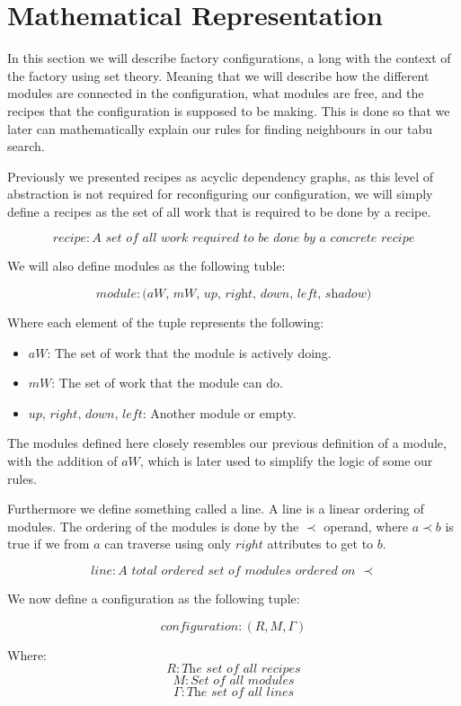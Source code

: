 \section{Mathematical Representation}

In this section we will describe factory configurations, a long with the context of the factory using set theory. Meaning that we will describe how the different modules are connected in the configuration, what modules are free, and the recipes that the configuration is supposed to be making. This is done so that we later can mathematically explain our rules for finding neighbours in our tabu search.

Previously we presented recipes as acyclic dependency graphs, as this level of abstraction is not required for reconfiguring our configuration, we will simply define a recipes as the set of all work that is required to be done by a recipe.

\[recipe: \textit{A set of all work required to be done by a concrete recipe}\]

\noindent We will also define modules as the following tuble:

\[module: \textit{(aW, mW, up, right, down, left, shadow)}\]

\noindent Where each element of the tuple represents the following:
\begin{itemize}
\item $aW$: The set of work that the module is actively doing.
\item $mW$: The set of work that the module can do.
\item $up,\, right,\, down,\, left$: Another module or empty.
\end{itemize}

The modules defined here closely resembles our previous definition of a module, with the addition of $aW$, which is later used to simplify the logic of some our rules.

Furthermore we define something called a line. A line is a linear ordering of modules. The ordering of the modules is done by the $\prec$ operand, where $a \prec b$ is true if we from $a$ can traverse using only $right$ attributes to get to $b$.

\[line: \textit{A total ordered set of modules ordered on } \prec\]

We now define a configuration as the following tuple:

\[configuration: (R, M, \Gamma)\]

Where:
\[R: \textit{The set of all recipes}\]
\[M: \textit{Set of all modules}\]
\[\Gamma: \textit{The set of all lines}\]



